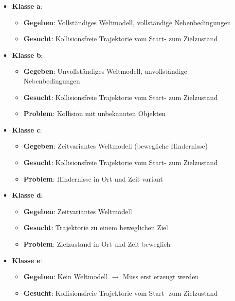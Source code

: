 \begin{itemize}
	\item \textbf{Klasse a}:
	\begin{itemize}
		\item \textbf{Gegeben}: Vollständiges Weltmodell, vollständige Nebenbedingungen
		\item \textbf{Gesucht}: Kollisionsfreie Trajektorie vom Start- zum Zielzustand 
	\end{itemize}
	\item \textbf{Klasse b}:
	\begin{itemize}
		\item \textbf{Gegeben}: Unvollständiges Weltmodell, unvollständige Nebenbedingungen
		\item \textbf{Gesucht}: Kollisionsfreie Trajektorie vom Start- zum Zielzustand 
		\item \textbf{Problem}: Kollision mit unbekannten Objekten 
	\end{itemize}
	\item \textbf{Klasse c}:
	\begin{itemize}
		\item \textbf{Gegeben}: Zeitvariantes Weltmodell (bewegliche Hindernisse)
		\item \textbf{Gesucht}: Kollisionsfreie Trajektorie vom Start- zum Zielzustand
		\item \textbf{Problem}: Hindernisse in Ort und Zeit variant
	\end{itemize}
	\item \textbf{Klasse d}:
	\begin{itemize}
		\item \textbf{Gegeben}: Zeitvariantes Weltmodell
		\item \textbf{Gesucht}: Trajektorie zu einem beweglichen Ziel
		\item \textbf{Problem}: Zielzustand in Ort und Zeit beweglich 
	\end{itemize}
	\item \textbf{Klasse e}:
	\begin{itemize}
		\item \textbf{Gegeben}: Kein Weltmodell $\rightarrow$ Muss erst erzeugt werden
		\item \textbf{Gesucht}: Kollisionsfreie Trajektorie vom Start- zum Zielzustand
	\end{itemize}
\end{itemize}

